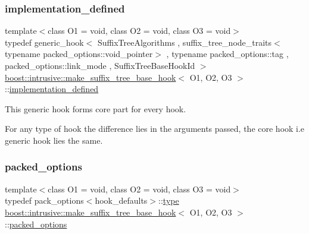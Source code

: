 \subsubsection{\texorpdfstring{implementation\+\_\+defined}{implementation\_defined}}
{\footnotesize\ttfamily template$<$class O1 = void, class O2 = void, class O3 = void$>$ \\
typedef generic\+\_\+hook$<$ Suffix\+Tree\+Algorithms , suffix\+\_\+tree\+\_\+node\+\_\+traits$<$typename packed\+\_\+options\+::void\+\_\+pointer$>$ , typename packed\+\_\+options\+::tag , packed\+\_\+options\+::link\+\_\+mode , Suffix\+Tree\+Base\+Hook\+Id $>$ \hyperlink{classboost_1_1intrusive_1_1make__suffix__tree__base__hook}{boost\+::intrusive\+::make\+\_\+suffix\+\_\+tree\+\_\+base\+\_\+hook}$<$ O1, O2, O3 $>$\+::\hyperlink{classboost_1_1intrusive_1_1make__suffix__tree__base__hook_a21cb881040ae75027aaa684f98669d45}{implementation\+\_\+defined}}


\begin{DoxyItemize}
\item This generic hook forms core part for every hook.  
\item For any type of hook the difference lies in the arguments passed, the core hook i.\+e generic hook lies the same. 
\end{DoxyItemize}\mbox{\label{classboost_1_1intrusive_1_1make__suffix__tree__base__hook_addb846ee0efa5e8b70f2788c2c6c3381}} 
\subsubsection{\texorpdfstring{packed\+\_\+options}{packed\_options}}
{\footnotesize\ttfamily template$<$class O1 = void, class O2 = void, class O3 = void$>$ \\
typedef pack\+\_\+options$<$hook\+\_\+defaults$>$\+::\hyperlink{classboost_1_1intrusive_1_1make__suffix__tree__base__hook_a72474fe783f53cf3da5ff706894eefd6}{type} \hyperlink{classboost_1_1intrusive_1_1make__suffix__tree__base__hook}{boost\+::intrusive\+::make\+\_\+suffix\+\_\+tree\+\_\+base\+\_\+hook}$<$ O1, O2, O3 $>$\+::\hyperlink{classboost_1_1intrusive_1_1make__suffix__tree__base__hook_addb846ee0efa5e8b70f2788c2c6c3381}{packed\+\_\+options}}

